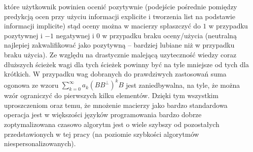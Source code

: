 \documentclass{pracamgr}
\begin{document}
    które użytkownik powinien ocenić pozytywnie (podejście pośrednie pomiędzy predykcją ocen przy użyciu informacji explicite
    i tworzenia list na podstawie informacji implicite) stąd oceny można w macierzy spłaszczyć do $1$ w przypadku pozytywnej i $-1$ negatywnej
    i $0$ w przypadku braku oceny/użycia (neutralną najlepiej zakwalifikować jako pozytywną -- bardziej lubiane niż w przypadku braku użycia).
    Ze względu na drastycznie malejącą uzyteczność wiedzy coraz dłuższych ścieżek wagi dla tych ścieżek powinny być na tyle mniejsze od tych dla krótkich.
    W przypadku wag dobranych do prawdziwych zastosowań suma ogonowa ze wzoru $\sum\limits_{k=0}^{\infty}a_k(BB^\bot)^kB$ jest zaniedbywalna, na tyle,
    że można wzór ograniczyć do pierwszych kilku elementów.\newline
    Dzięki tym wszystkim uproszczeniom oraz temu,
    że mnożenie macierzy jako bardzo standardowa operacja jest w większości języków programowania bardzo dobrze zoptymalizowana czasowo algorytm
    jest o wiele szybszy od pozostałych przedstawionych w tej pracy (na poziomie szybkości algorytmów niespersonalizowanych).
\end{document}

